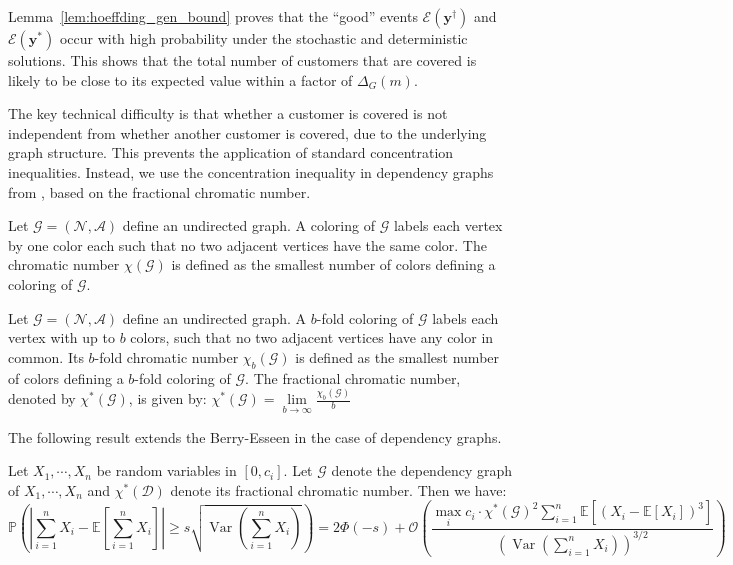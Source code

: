 \documentclass[nonblindrev]{informs3noheader}
\DeclareMathOperator{\Var}{Var}
\def\E{\mathbb{E}}
\def\P{\mathbb{P}}
\def\calA{\mathcal{A}}
\def\calD{\mathcal{D}}
\def\calE{\mathcal{E}}
\def\calG{\mathcal{G}}
\def\calN{\mathcal{N}}
\def\calO{\mathcal{O}}
\def\by{\boldsymbol{y}}
\begin{document}
Lemma~\ref{lem:hoeffding_gen_bound} proves that the ``good'' events $\calE(\by^\dagger)$ and $\calE(\by^*)$ occur with high probability under the stochastic and deterministic solutions. This shows that the total number of customers that are covered is likely to be close to its expected value within a factor of $\Delta_G(m)$.

The key technical difficulty is that whether a customer is covered is not independent from whether another customer is covered, due to the underlying graph structure. This prevents the application of standard concentration inequalities. Instead, we use the concentration inequality in dependency graphs from \cite{janisch2024berry}, based on the fractional chromatic number.

\begin{definition}\label{def:chromatic}
    Let $\calG=(\calN,\calA)$ define an undirected graph. A coloring of $\calG$ labels each vertex by one color each such that no two adjacent vertices have the same color. The chromatic number $\chi(\calG)$ is defined as the smallest number of colors defining a coloring of $\calG$.
\end{definition}

\begin{definition}\label{def:Fchromatic}
    Let $\calG=(\calN,\calA)$ define an undirected graph. A $b$-fold coloring of $\calG$ labels each vertex with up to $b$ colors, such that no two adjacent vertices have any color in common. Its $b$-fold chromatic number $\chi_b(\calG)$ is defined as the smallest number of colors defining a $b$-fold coloring of $\calG$. The fractional chromatic number, denoted by $\chi^*(\calG)$, is given by: $\chi^*(\calG)=\lim\limits_{b\to\infty}\frac{\chi_b(\calG)}{b}$
\end{definition}

The following result extends the Berry-Esseen in the case of dependency graphs.
\begin{theorem}
	Let $X_1,\cdots, X_n$ be random variables in $[0,c_i]$. Let $\calG$ denote the dependency graph of $X_1,\cdots, X_n$ and $\chi^*(\calD)$ denote its fractional chromatic number. Then we have:
	\begin{equation*}
		\P\left(\left|\sum_{i=1}^n X_i - \E\left[\sum_{i=1}^n X_i\right]\right|\geq s \sqrt{\Var\left(\sum_{i=1}^n X_i\right)}\right)=2\Phi(-s) +\calO\left(\frac{\max_{i} c_i \cdot \chi^*(\calG)^2 \sum_{i=1}^n \E\left[(X_i-\E[X_i])^3\right]}{\left(\Var\left(\sum_{i=1}^n X_i\right)\right)^{3/2}}\right)
	\end{equation*}
\end{theorem}
\end{document}
